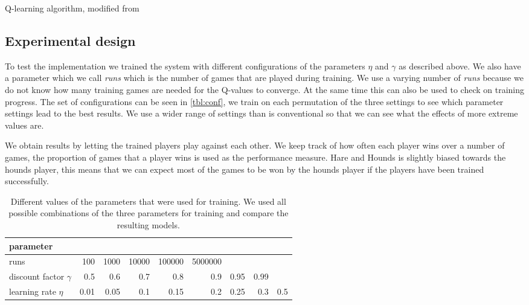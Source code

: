\begin{algorithm}
\caption{Q-learning algorithm, modified from \cite{alpaydin}}
\label{alg:Qlearning}
\begin{algorithmic}[1]
	\Repeat
\EndFor
\end{algorithmic}
\end{algorithm}

\subsection{Experimental design}
To test the implementation we trained the system with different
configurations of the parameters $\eta$ and $\gamma$ as described above. We
also have a parameter which we call \emph{runs} which is the number of games
that are played during training. We use a varying number of \emph{runs}
because we do not know how many training games are needed for the Q-values to
converge. At the same time this can also be used to check on training progress.
The set of configurations can be seen in \autoref{tbl:conf}, we train on each
permutation of the three settings to see which parameter settings lead to the
best results. We use a wider range of settings than is conventional so that we
can see what the effects of more extreme values are.

We obtain results by letting the trained players play against each other. We
keep track of how often each player wins over a number of games, the
proportion of games that a player wins is used as the performance measure. Hare
and Hounds is slightly biased towards the hounds player, this means that we can
expect most of the games to be won by the hounds player if the players have
been trained successfully.

\begin{table}
    \centering
    \caption{Different values of the parameters that were used for training.
    	We used all possible combinations of the three parameters for training
    	and compare the resulting models.}
    \label{tbl:conf}
    \begin{tabular}{l|rrrrrrrr}
        \hline
        parameter & \\
        \hline
        runs & 100 & 1000 & 10000 & 100000 & 5000000 \\
        discount factor $\gamma$ & 0.5 & 0.6 & 0.7 & 0.8 & 0.9 & 0.95 &
        0.99 \\
        learning rate $\eta$ & 0.01 & 0.05 & 0.1 & 0.15 & 0.2 & 0.25 & 0.3
        & 0.5 \\
        \hline
    \end{tabular}
\end{table}
